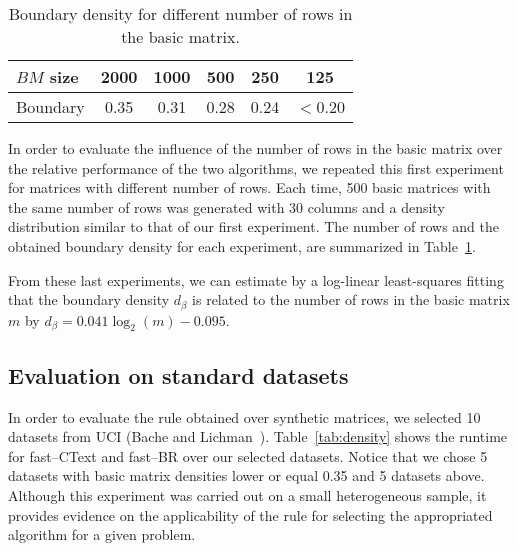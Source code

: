 \documentclass[citeauthoryear]{llncs}
\begin{document}
	\begin{table}[htb]
		\centering 
		\setlength{\tabcolsep}{12pt}
		\caption{Boundary density for different number of rows in the basic matrix.}
		\label{tab:boundary}
		\begin{tabular}{lccccc}
			\hline
			$BM$ size & 2000 & 1000 & 500 & 250 & 125 \\
			\hline
			Boundary  & 0.35 & 0.31 & 0.28 & 0.24 & $<$0.20 \\		
			\hline
		\end{tabular}
	\end{table}
	
	In order to evaluate the influence of the number of rows in the basic matrix over the relative performance of the two algorithms, we repeated this first experiment for matrices with different number of rows. Each time, 500 basic matrices with the same number of rows was generated with 30 columns and a density distribution similar to that of our first experiment. The number of rows and the obtained boundary density for each experiment, are summarized in Table~\ref{tab:boundary}. 
	
	From these last experiments, we can estimate by a log-linear least-squares fitting that the boundary density $d_\beta$ is related to the number of rows in the basic matrix $m$ by $d_\beta=0.041\log_2(m)-0.095$.
%
\subsection{Evaluation on standard datasets}
%
	In order to evaluate the rule obtained over synthetic matrices, we selected 10 datasets from UCI (Bache and Lichman~\cite{Bache13}). Table~\ref{tab:density} shows the runtime for fast--CText and fast--BR over our selected datasets. Notice that we chose 5 datasets with basic matrix densities lower or equal 0.35 and 5 datasets above. Although this experiment was carried out on a small heterogeneous sample, it provides evidence on the applicability of the rule for selecting the appropriated algorithm for a given problem.
	
\end{document}
